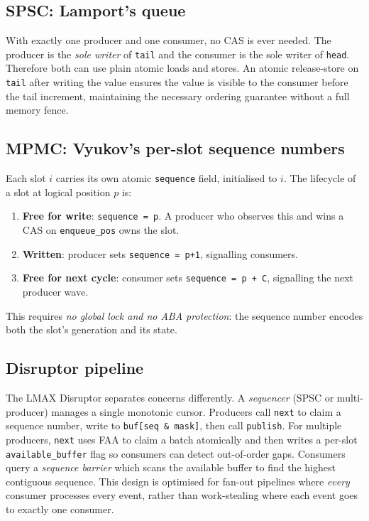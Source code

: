 \documentclass[11pt,a4paper]{article}
\begin{document}
\subsection{SPSC: Lamport's queue~\cite{lamport83}}

With exactly one producer and one consumer, no CAS is ever needed. The producer is the
\emph{sole writer} of \texttt{tail} and the consumer is the sole writer of \texttt{head}.
Therefore both can use plain atomic loads and stores. An atomic release-store on
\texttt{tail} after writing the value ensures the value is visible to the consumer
before the tail increment, maintaining the necessary ordering guarantee without a full
memory fence.

\subsection{MPMC: Vyukov's per-slot sequence numbers~\cite{vyukov10}}

Each slot $i$ carries its own atomic \texttt{sequence} field, initialised to $i$.
The lifecycle of a slot at logical position $p$ is:
\begin{enumerate}[noitemsep]
  \item \textbf{Free for write}: \texttt{sequence = p}. A producer who observes this and wins a CAS on \texttt{enqueue\_pos} owns the slot.
  \item \textbf{Written}: producer sets \texttt{sequence = p+1}, signalling consumers.
  \item \textbf{Free for next cycle}: consumer sets \texttt{sequence = p + C}, signalling the next producer wave.
\end{enumerate}
This requires \emph{no global lock and no ABA protection}: the sequence number encodes both the slot's generation and its state.

\subsection{Disruptor pipeline~\cite{disruptor}}

The LMAX Disruptor separates concerns differently. A \emph{sequencer} (SPSC or multi-producer)
manages a single monotonic cursor. Producers call \texttt{next} to claim a sequence number,
write to \texttt{buf[seq \& mask]}, then call \texttt{publish}. For multiple producers,
\texttt{next} uses FAA to claim a batch atomically and then writes a per-slot
\texttt{available\_buffer} flag so consumers can detect out-of-order gaps.
Consumers query a \emph{sequence barrier} which scans the available buffer to find the
highest contiguous sequence. This design is optimised for fan-out pipelines where \emph{every}
consumer processes every event, rather than work-stealing where each event goes to exactly
one consumer.
\end{document}
